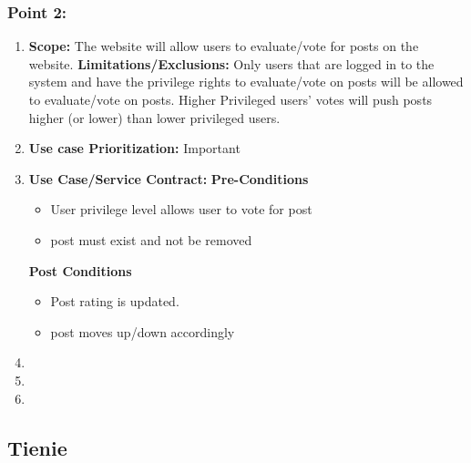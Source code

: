\documentclass[11pt]{article}
\begin{document}
	  \subsubsection{Point 2:}
	  \begin{enumerate}
	  
	  
	  \item \textbf{Scope:} The website will allow users to evaluate/vote for posts on the website. \newline \newline
	  \textbf{Limitations/Exclusions:} Only users that are logged in to the system and have the privilege rights to evaluate/vote on posts will be allowed to evaluate/vote on posts. Higher Privileged users' votes will push posts higher (or lower) than lower privileged users. \newline \newline
	  
	  \item \textbf{Use case Prioritization: } Important \newline \newline
	  \item \textbf{Use Case/Service Contract: } \newline \newline
	  \textbf{Pre-Conditions}
	  \begin{itemize}
	  
	  \item User privilege level allows user to vote for post
	  \item post must exist and not be removed
	  \end{itemize}
	  \textbf{Post Conditions}
	  \begin{itemize}
	  \item Post rating is updated.
	  \item post moves up/down accordingly
	  \end{itemize}
	  \item
	  \item
	  \item
	  \end{enumerate}

\newpage

\graphicspath{ {../Diagrams/Tienie/Plagiarism/} }

\subsection{Tienie}
\end{document}

